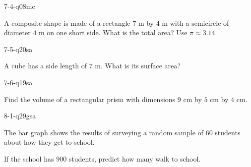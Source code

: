 \begin{practiceQuestion}{7-4-q08}{mc}
\begin{questionText}
A composite shape is made of a rectangle $7$ m by $4$ m with a semicircle of diameter $4$ m on one short side. What is the total area? Use $\pi \approx 3.14$.
\end{questionText}
\end{practiceQuestion}

\begin{practiceQuestion}{7-5-q20}{sa}
\begin{questionText}
A cube has a side length of $7$ m. What is its surface area?
\end{questionText}
\end{practiceQuestion}

\begin{practiceQuestion}{7-6-q19}{sa}
\begin{questionText}
Find the volume of a rectangular prism with dimensions $9$ cm by $5$ cm by $4$ cm.
\end{questionText}
\end{practiceQuestion}

\begin{practiceQuestion}{8-1-q29}{gsa}
\begin{questionText}
The bar graph shows the results of surveying a random sample of $60$ students about how they get to school.

\begin{center}
\end{center}

If the school has $900$ students, predict how many walk to school.
\end{questionText}
\end{practiceQuestion}

